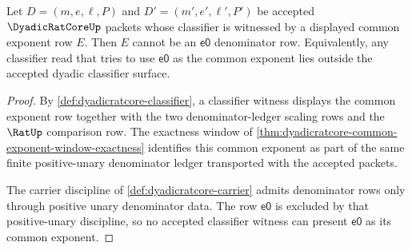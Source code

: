 \begin{theorem}
\label{thm:dyadicratcore-common-exponent-e0-exclusion}
Let $D=(m,e,\ell,P)$ and $D'=(m',e',\ell',P')$ be accepted
$\DyadicRatCoreUp$ packets whose classifier is witnessed by a displayed
common exponent row $E$. Then $E$ cannot be an $\mathsf{e0}$ denominator row.
Equivalently, any classifier read that tries to use $\mathsf{e0}$ as the
common exponent lies outside the accepted dyadic classifier surface.
\end{theorem}
\begin{proof}
By \autoref{def:dyadicratcore-classifier}, a classifier witness displays the
common exponent row together with the two denominator-ledger scaling rows and
the $\RatUp$ comparison row. The exactness window of
\autoref{thm:dyadicratcore-common-exponent-window-exactness} identifies this
common exponent as part of the same finite positive-unary denominator ledger
transported with the accepted packets.

The carrier discipline of \autoref{def:dyadicratcore-carrier} admits
denominator rows only through positive unary denominator data. The row
$\mathsf{e0}$ is excluded by that positive-unary discipline, so no accepted
classifier witness can present $\mathsf{e0}$ as its common exponent.
\end{proof}


